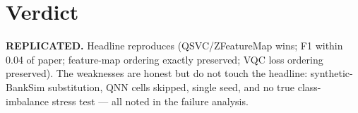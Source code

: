 \documentclass[11pt]{article}
\begin{document}
\section{Verdict}
\textbf{REPLICATED.} Headline reproduces (QSVC/ZFeatureMap wins; F1 within 0.04 of
paper; feature-map ordering exactly preserved; VQC loss ordering preserved). The
weaknesses are honest but do not touch the headline: synthetic-BankSim substitution,
QNN cells skipped, single seed, and no true class-imbalance stress test --- all
noted in the failure analysis.


\end{document}
